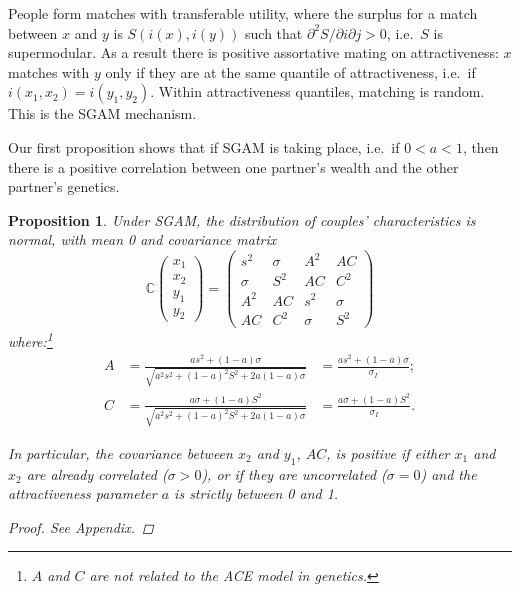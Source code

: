 \documentclass[
]{article}
\newtheorem{proposition}{Proposition}
\theoremstyle{definition}
\theoremstyle{definition}
\theoremstyle{definition}
\theoremstyle{definition}
\theoremstyle{remark}
\begin{document}
People form matches with transferable utility, where the surplus for a match
between \(x\) and \(y\) is \(S(i(x), i(y))\) such that \(\partial^{2}S/\partial
i\partial j > 0\), i.e.~\(S\) is supermodular. As a result there is positive
assortative mating on attractiveness: \(x\) matches with \(y\) only if they are at
the same quantile of attractiveness, i.e.~if \(i(x_{1},x_{2}) = i(y_{1},y_{2})\).
Within attractiveness quantiles, matching is random. This is the
SGAM mechanism.

Our first proposition shows that if SGAM is taking place, i.e.~if \(0 < a < 1\), then
there is a positive correlation between one partner's wealth and the other
partner's genetics.

\begin{proposition}\label{prop-couples-SGAM}
Under SGAM, the distribution of couples' characteristics is normal, with mean 0
and covariance matrix
\begin{equation}\label{cov-couples-SGAM}
\mathbb{C}\left( 
\begin{array}{c}
x_{1} \\ 
x_{2} \\ 
y_{1} \\ 
y_{2}%
\end{array}%
\right) =\allowbreak \left( 
\begin{array}{cccc}
s^{2} & \sigma  & A^{2} & AC \\ 
\sigma  & S^{2} & AC & C^{2} \\ 
A^{2} & AC & s^{2} & \sigma  \\ 
AC & C^{2} & \sigma  & S^{2}%
\end{array}%
\right) \allowbreak 
\end{equation}
where:\footnote{$A$ and $C$ are not related to the ACE model in genetics.}
\begin{align*}
A &= \frac{as^{2}+\left( 1-a\right) \sigma }{\sqrt{a^{2}s^{2}+\left(
1-a\right) ^{2}S^{2}+2a\left( 1-a\right) \sigma }} &= \frac{as^{2}+\left( 1-a\right) \sigma }{\sigma_I}; \\
C &= \frac{a\sigma +\left( 1-a\right) S^{2}}{\sqrt{a^{2}s^{2}+\left(
1-a\right) ^{2}S^{2}+2a\left( 1-a\right) \sigma }} &= \frac{a\sigma +\left( 1-a\right) S^{2}}{\sigma_I}.
\end{align*}

In particular, the covariance between $x_2$ and $y_1$, $AC$, is positive if
either $x_1$ and $x_2$ are already correlated ($\sigma > 0$), or if they are
uncorrelated ($\sigma = 0$) and the attractiveness parameter $a$ is strictly
between 0 and 1.

\begin{proof}
See Appendix.
\end{proof}
\end{proposition}
\end{document}
